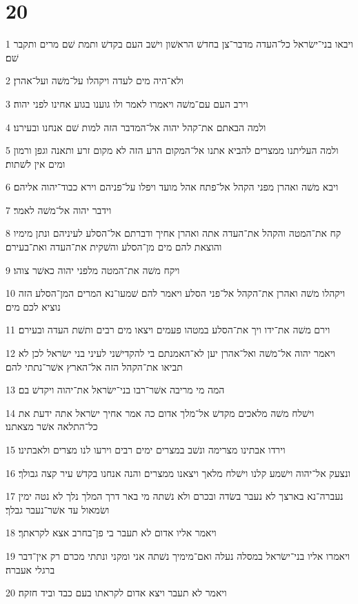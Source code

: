 \chapter{20}

\par 1 ויבאו בני־ישׂראל כל־העדה מדבר־צן בחדשׁ הראשׁון וישׁב העם בקדשׁ ותמת שׁם מרים ותקבר שׁם׃
\par 2 ולא־היה מים לעדה ויקהלו על־משׁה ועל־אהרן׃
\par 3 וירב העם עם־משׁה ויאמרו לאמר ולו גוענו בגוע אחינו לפני יהוה׃
\par 4 ולמה הבאתם את־קהל יהוה אל־המדבר הזה למות שׁם אנחנו ובעירנו׃
\par 5 ולמה העליתנו ממצרים להביא אתנו אל־המקום הרע הזה לא מקום זרע ותאנה וגפן ורמון ומים אין לשׁתות׃
\par 6 ויבא משׁה ואהרן מפני הקהל אל־פתח אהל מועד ויפלו על־פניהם וירא כבוד־יהוה אליהם׃
\par 7 וידבר יהוה אל־משׁה לאמר׃
\par 8 קח את־המטה והקהל את־העדה אתה ואהרן אחיך ודברתם אל־הסלע לעיניהם ונתן מימיו והוצאת להם מים מן־הסלע והשׁקית את־העדה ואת־בעירם׃
\par 9 ויקח משׁה את־המטה מלפני יהוה כאשׁר צוהו׃
\par 10 ויקהלו משׁה ואהרן את־הקהל אל־פני הסלע ויאמר להם שׁמעו־נא המרים המן־הסלע הזה נוציא לכם מים׃
\par 11 וירם משׁה את־ידו ויך את־הסלע במטהו פעמים ויצאו מים רבים ותשׁת העדה ובעירם׃
\par 12 ויאמר יהוה אל־משׁה ואל־אהרן יען לא־האמנתם בי להקדישׁני לעיני בני ישׂראל לכן לא תביאו את־הקהל הזה אל־הארץ אשׁר־נתתי להם׃
\par 13 המה מי מריבה אשׁר־רבו בני־ישׂראל את־יהוה ויקדשׁ בם׃
\par 14 וישׁלח משׁה מלאכים מקדשׁ אל־מלך אדום כה אמר אחיך ישׂראל אתה ידעת את כל־התלאה אשׁר מצאתנו׃
\par 15 וירדו אבתינו מצרימה ונשׁב במצרים ימים רבים וירעו לנו מצרים ולאבתינו׃
\par 16 ונצעק אל־יהוה וישׁמע קלנו וישׁלח מלאך ויצאנו ממצרים והנה אנחנו בקדשׁ עיר קצה גבולך׃
\par 17 נעברה־נא בארצך לא נעבר בשׂדה ובכרם ולא נשׁתה מי באר דרך המלך נלך לא נטה ימין ושׂמאול עד אשׁר־נעבר גבלך׃
\par 18 ויאמר אליו אדום לא תעבר בי פן־בחרב אצא לקראתך׃
\par 19 ויאמרו אליו בני־ישׂראל במסלה נעלה ואם־מימיך נשׁתה אני ומקני ונתתי מכרם רק אין־דבר ברגלי אעברה׃
\par 20 ויאמר לא תעבר ויצא אדום לקראתו בעם כבד וביד חזקה׃

